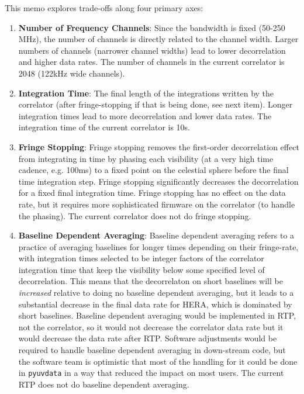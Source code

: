 \documentclass{article}
\begin{document}
This memo explores trade-offs along four primary axes:

\begin{enumerate}
\item \textbf{Number of Frequency Channels}: Since the bandwidth is fixed (50-250 MHz), the number of channels is directly related to the channel 
width. Larger numbers of channels (narrower channel widths) lead to lower decorrelation and higher data rates.
The number of channels in the current correlator is 2048 (122kHz wide channels).
\item \textbf{Integration Time}: The final length of the integrations written by the correlator (after fringe-stopping if that is being done, see next item). 
Longer integration times lead to more decorrelation and lower data rates. The integration time of the current correlator is 10s.
\item \textbf{Fringe Stopping}: Fringe stopping removes the first-order decorrelation effect from integrating in time by phasing each visibility (at a very 
high time cadence, e.g. 100ms) to a fixed point on the celestial sphere before the final time integration step. Fringe stopping significantly decreases 
the decorrelation for a fixed final integration time. Fringe stopping has no effect on the data rate, but it requires more sophisticated firmware on the 
correlator (to handle the phasing). The current correlator does not do fringe stopping.
\item \textbf{Baseline Dependent Averaging}: Baseline dependent averaging refers to a practice of averaging baselines for longer times depending on 
their fringe-rate, with integration times selected to be integer factors of the correlator integration time that keep the visibility below some specified 
level of decorrelation. This means that the decorrelaton on short baselines will be \textit{increased} relative to doing no baseline dependent 
averaging, but it leads to a substantial decrease in the final data rate for HERA, which is dominated by short baselines. Baseline dependent 
averaging would be implemented in RTP, not the correlator, so it would not decrease the correlator data rate but it would decrease the data rate after 
RTP. Software adjustments would be required to handle baseline dependent averaging in down-stream code, but the software team is optimistic that 
most of the handling for it could be done in \texttt{pyuvdata} in a way that reduced the impact on most users. The current RTP does not do baseline 
dependent averaging.
\end{enumerate}
\end{document}
